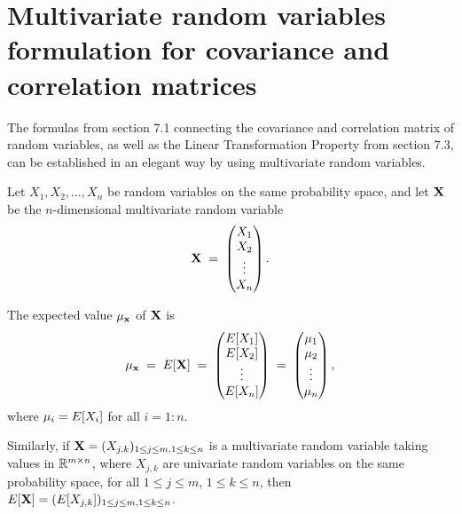 
\section{Multivariate random variables formulation for covariance and correlation matrices}

The formulas from section 7.1 connecting the covariance and correlation matrix of
random variables, as well as the Linear Transformation Property from section 7.3, can
be established in an elegant way by using multivariate random variables.

Let $X_1, X_2, \ldots, X_n$ be random variables on the same probability space, and let
$\mathbf{X}$ be the $n$-dimensional multivariate random variable
\begin{equation}
\mathbf{X} \;=\; \begin{pmatrix} X_1 \\ X_2 \\ \vdots \\ X_n \end{pmatrix}.
\end{equation}

The expected value $\mu_{\mathbf{x}}$ of $\mathbf{X}$ is
\[
\mu_{\mathbf{x}} \;=\; E\!\left[\mathbf{X}\right] \;=\; \begin{pmatrix} E\!\left[X_1\right] \\ E\!\left[X_2\right] \\ \vdots \\ E\!\left[X_n\right]
\end{pmatrix} \;=\; \begin{pmatrix} \mu_1 \\ \mu_2 \\ \vdots \\ \mu_n \end{pmatrix},
\]
where $\mu_i = E\!\left[X_i\right]$ for all $i = 1:n$.

Similarly, if $\mathbf{X} = (X_{j,k})_{1\le j\le m,1\le k\le n}$ is a multivariate random
variable taking values in $\mathbb{R}^{m\times n}$, where $X_{j,k}$ are univariate random
variables on the same probability space, for all $1\le j\le m$, $1\le k\le n$, then
$E\!\left[\mathbf{X}\right] = (E\!\left[X_{j,k}\right])_{1\le j\le m,1\le k\le n}$.

